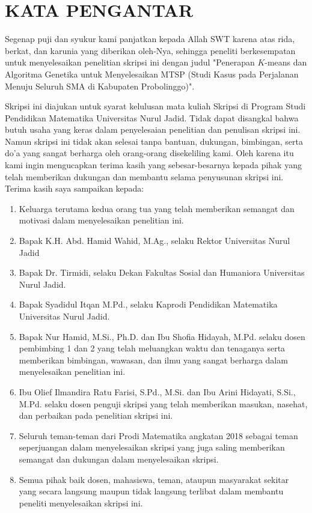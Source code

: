 \newpage
\chapter*{KATA PENGANTAR}

Segenap puji dan syukur kami panjatkan kepada Allah SWT karena atas rida, berkat, dan karunia yang diberikan oleh-Nya, sehingga peneliti berkesempatan untuk menyelesaikan penelitian skripsi ini dengan judul "Penerapan $K$-means dan Algoritma Genetika untuk Menyelesaikan MTSP (Studi Kasus pada Perjalanan Menuju Seluruh SMA di Kabupaten Probolinggo)".

Skripsi ini diajukan untuk syarat kelulusan mata kuliah Skripsi di Program Studi Pendidikan Matematika Universitas Nurul Jadid. Tidak dapat disangkal bahwa butuh usaha yang keras dalam penyelesaian penelitian dan penulisan skripsi ini. Namun skripsi ini tidak akan selesai tanpa bantuan, dukungan, bimbingan, serta do'a yang sangat berharga oleh orang-orang disekeliling kami. Oleh karena itu kami ingin mengucapkan terima kasih yang sebesar-besarnya kepada pihak yang telah memberikan dukungan dan membantu selama penyusunan skripsi ini. Terima kasih saya sampaikan kepada:

\begin{enumerate}
	\item Keluarga terutama kedua orang tua yang telah memberikan semangat dan motivasi dalam menyelesaikan penelitian ini.
	\item Bapak K.H. Abd. Hamid Wahid, M.Ag., selaku Rektor Universitas Nurul Jadid
	\item Bapak Dr. Tirmidi, selaku Dekan Fakultas Sosial dan Humaniora Universitas Nurul Jadid.
	\item Bapak Syadidul Itqan M.Pd., selaku Kaprodi Pendidikan Matematika Universitas Nurul Jadid.
	\item Bapak Nur Hamid, M.Si., Ph.D. dan Ibu Shofia Hidayah, M.Pd. selaku dosen pembimbing 1 dan 2 yang telah meluangkan waktu dan tenaganya serta memberikan bimbingan, wawasan, dan ilmu yang sangat berharga dalam menyelesaikan penelitian ini.
	\item Ibu Olief Ilmandira Ratu Farisi, S.Pd., M.Si. dan Ibu Arini Hidayati, S.Si., M.Pd. selaku dosen penguji skripsi yang telah memberikan masukan, nasehat, dan perbaikan pada penelitian skripsi ini.
	\item Seluruh teman-teman dari Prodi Matematika angkatan 2018 sebagai teman seperjuangan dalam menyelesaikan skripsi yang juga saling memberikan semangat dan dukungan dalam menyelesaikan skripsi.
	\item Semua pihak baik dosen, mahasiswa, teman, ataupun masyarakat sekitar yang secara langsung maupun tidak langsung terlibat dalam membantu peneliti menyelesaikan skripsi ini.
\end{enumerate}

